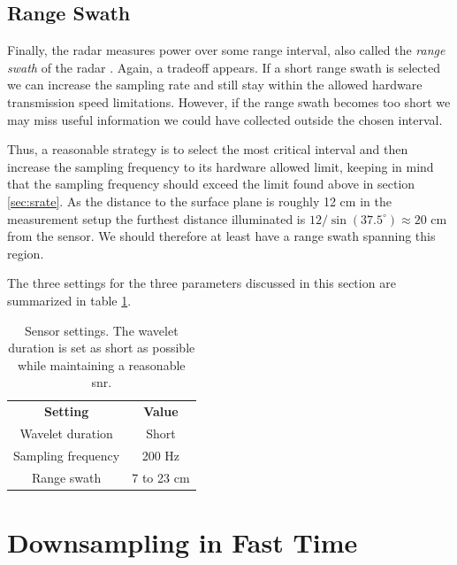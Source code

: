 \subsection{Range Swath}

Finally, the radar measures power over some range interval, also called the \emph{range swath} of the radar \citep{richards_2014}. Again, a tradeoff appears. If a short range swath is selected we can increase the sampling rate and still stay within the allowed hardware transmission speed limitations. However, if the range swath becomes too short we may miss useful information we could have collected outside the chosen interval. 

Thus, a reasonable strategy is to select the most critical interval and then increase the sampling frequency to its hardware allowed limit, keeping in mind that the sampling frequency should exceed the limit found above in section \ref{sec:srate}. As the distance to the surface plane is roughly 12 cm in the measurement setup the furthest distance illuminated is $12/\sin(37.5^\circ)\approx 20$ cm from the sensor. We should therefore at least have a range swath spanning this region. 

The three settings for the three parameters discussed in this section are summarized in table \ref{tab:sensor_settings}.

\begin{table}
\begin{center}
	\begin{tabular}{|c|c|}
	  	\hline
	  	\cellcolor{gray!150}\color{white}\textbf{Setting} & \cellcolor{gray!150}\color{white}\textbf{Value} \\
	 	 Wavelet duration & Short \\
	  	\cellcolor{gray!25}Sampling frequency & \cellcolor{gray!25}200 Hz \\
	  	Range swath & 7 to 23 cm \\ 
		\hline
  	\end{tabular}	
\end{center}
	\caption{Sensor settings. The wavelet duration is set as short as possible while maintaining a reasonable \gls{snr}.}
\label{tab:sensor_settings}
\end{table}

\section{Downsampling in Fast Time}
\label{downsampling}


